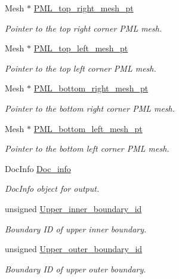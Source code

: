 \begin{DoxyCompactItemize}
Mesh $\ast$ \hyperlink{classElasticAnnulusProblem_a508de7ec878f9b32c279623c1dad31fd}{P\+M\+L\+\_\+top\+\_\+right\+\_\+mesh\+\_\+pt}
\begin{DoxyCompactList}\small\item\em Pointer to the top right corner P\+ML mesh. \end{DoxyCompactList}\item 
Mesh $\ast$ \hyperlink{classElasticAnnulusProblem_ad1c027ba9ff28ce9d9fda09273721ef3}{P\+M\+L\+\_\+top\+\_\+left\+\_\+mesh\+\_\+pt}
\begin{DoxyCompactList}\small\item\em Pointer to the top left corner P\+ML mesh. \end{DoxyCompactList}\item 
Mesh $\ast$ \hyperlink{classElasticAnnulusProblem_a220bc42fa49c06f91810f59eb83f8526}{P\+M\+L\+\_\+bottom\+\_\+right\+\_\+mesh\+\_\+pt}
\begin{DoxyCompactList}\small\item\em Pointer to the bottom right corner P\+ML mesh. \end{DoxyCompactList}\item 
Mesh $\ast$ \hyperlink{classElasticAnnulusProblem_a34551d6f7265da8cc2a1657fa0d605a0}{P\+M\+L\+\_\+bottom\+\_\+left\+\_\+mesh\+\_\+pt}
\begin{DoxyCompactList}\small\item\em Pointer to the bottom left corner P\+ML mesh. \end{DoxyCompactList}\item 
Doc\+Info \hyperlink{classElasticAnnulusProblem_a7d98599c2867fda5aab1719292c4623d}{Doc\+\_\+info}
\begin{DoxyCompactList}\small\item\em Doc\+Info object for output. \end{DoxyCompactList}\item 
unsigned \hyperlink{classElasticAnnulusProblem_af7228afd4d413dfd09e7a4b5bccedd64}{Upper\+\_\+inner\+\_\+boundary\+\_\+id}
\begin{DoxyCompactList}\small\item\em Boundary ID of upper inner boundary. \end{DoxyCompactList}\item 
unsigned \hyperlink{classElasticAnnulusProblem_a30ffabbfca663989fe1e787ff7ec21ba}{Upper\+\_\+outer\+\_\+boundary\+\_\+id}
\begin{DoxyCompactList}\small\item\em Boundary ID of upper outer boundary. \end{DoxyCompactList}\item 

\end{DoxyCompactItemize}
